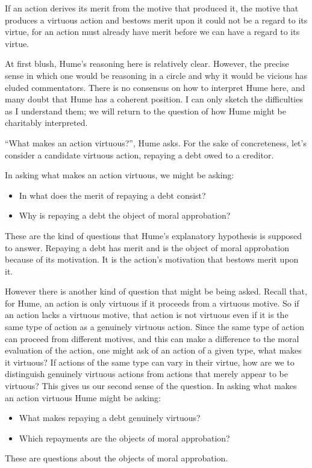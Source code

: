 If an action derives its merit from the motive that produced it, the motive that produces a virtuous action and bestows merit upon it could not be a regard to its virtue, for an action must already have merit before we can have a regard to its virtue.

At first blush, Hume’s reasoning here is relatively clear. However, the precise sense in which one would be reasoning in a circle and why it would be vicious has eluded commentators. There is no consensus on how to interpret Hume here, and many doubt that Hume has a coherent position. I can only sketch the difficulties as I understand them; we will return to the question of how Hume might be charitably interpreted.

``What makes an action virtuous?'', Hume asks. For the sake of concreteness, let’s consider a candidate virtuous action, repaying a debt owed to a creditor. \change

In asking what makes an action virtuous, we might be asking:
\begin{itemize}
    \item In what does the merit of repaying a debt consist? 
    \item Why is repaying a debt the object of moral approbation?
\end{itemize}
These are the kind of questions that Hume’s explanatory hypothesis is supposed to answer. Repaying a debt has merit and is the object of moral approbation because of its motivation. It is the action’s motivation that bestows merit upon it. \change

However there is another kind of question that might be being asked. Recall that, for Hume, an action is only virtuous if it proceeds from a virtuous motive. So if an action lacks a virtuous motive, that action is not virtuous even if it is the same type of action as a genuinely virtuous action. Since the same type of action can proceed from different motives, and this can make a difference to the moral evaluation of the action, one might ask of an action of a given type, what makes it virtuous? If actions of the same type can vary in their virtue, how are we to distinguish genuinely virtuous actions from actions that merely appear to be virtuous? This gives us our second sense of the question. In asking what makes an action virtuous Hume might be asking:
\begin{itemize}
    \item What makes repaying a debt genuinely virtuous? 
    \item Which repayments are the objects of moral approbation?
\end{itemize}
These are questions about the objects of moral approbation.

